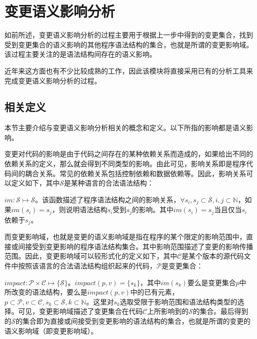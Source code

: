 


\section{变更语义影响分析}
\label {chap_impact}
如前所述，变更语义影响分析的过程主要用于根据上一步中得到的变更集合，找到受到变更集合的语义影响的其他程序语法结构的集合，也就是所谓的变更影响域。该过程主要关注的是语法结构间存在的语义影响。

近年来这方面也有不少比较成熟的工作，因此该模块将直接采用已有的分析工具来完成变更语义影响分析的过程。


\subsection{相关定义}

\label {sec_impact}

本节主要介绍与变更语义影响分析相关的概念和定义。以下所指的影响都是语义影响。

变更对代码的影响是由于代码之间存在的某种依赖关系而造成的，如果给出不同的依赖关系的定义，那么就会得到不同类型的影响。由此可见，影响关系即是程序代码间的耦合关系。常见的依赖关系包括控制依赖和数据依赖等。因此，影响关系可以定义如下，其中$\mathcal{S}$是某种语言的合法语法结构：

\begin{definition}
	$im: \mathcal{S} \mapsto \mathcal{S}$。该函数描述了程序语法结构之间的影响关系，$\forall s_i,s_j \subset \mathcal{S},i,j \subset \mathbb{N}$，如果$im(s_i) = s_j$，则说明语法结构$s_i$受到$s_j$的影响。其中$im(s_i) = s_j$当且仅当$s_i$依赖于$s_j$。
\end{definition}



而变更影响域，也就是变更的语义影响域是指在程序的某个限定的影响范围中，直接或间接受到变更影响的程序语法结构集合。其中影响范围描述了变更的影响传播范围。因此，变更影响域可以较形式化的定义如下，其中$\mathcal{C}$是某个版本的源代码文件中按照该语言的合法语法结构组织起来的代码，$\mathcal{P}$是变更集合：
\begin{definition}
	$impact: \mathcal{P} \times \mathcal{C} \mapsto \{\mathcal{S}\}$。$impact(p,v) = \{s_k\}$，其中$im(s_k)$要么是变更集合$p$中所改变的语法结构，要么是$impact(p,v)$中的已有元素，$p \subset \mathcal{P},v \subset \mathcal{C}, s_k \subset \mathcal{S},k \subset \mathbb{N}$。这里对$s_k$选取受限于影响范围和语法结构类型的选择。可见，变更影响域描述了变更集合在代码$\mathcal{C}$上所影响到的$\mathcal{S}$的集合。最后得到的$\mathcal{S}$的集合即为直接或间接受到变更影响的语法结构的集合，也就是所谓的变更的语义影响域（即变更影响域）。
\end{definition}

